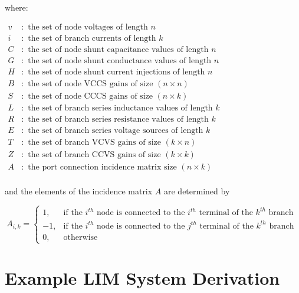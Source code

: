 where: 
\smallskip

$\begin{aligned}
    v & : \text{ the set of node voltages of length } n \\
    i & : \text{ the set of branch currents of length } k \\
    C & : \text{ the set of node shunt capacitance values of length } n \\
    G & : \text{ the set of node shunt conductance values of length } n \\
    H & : \text{ the set of node shunt current injections of length } n \\
    B & : \text{ the set of node VCCS gains of size } (n \times n) \\
    S & : \text{ the set of node CCCS gains of size } (n \times k) \\
    L & : \text{ the set of branch series inductance values of length } k \\
    R & : \text{ the set of branch series resistance values of length } k \\
    E & : \text{ the set of branch series voltage sources of length } k \\
    T & : \text{ the set of branch VCVS gains of size } (k \times n) \\
    Z & : \text{ the set of branch CCVS gains of size } (k \times k) \\
    A & : \text{ the port connection incidence matrix size } (n \times k) \\
\end{aligned}$

\bigskip
and the elements of the incidence matrix $A$ are determined by
\smallskip

\begin{equation} \label{eq:a_matrix}
    A_{i, k} = 
    \begin{cases}
        1,  & \text{if the } i^{th} \text{ node is connected to the } i^{th} \text{ terminal of the } k^{th} \text{ branch }\\ 
        -1, & \text{if the } i^{th} \text{ node is connected to the } j^{th} \text{ terminal of the } k^{th} \text{ branch }\\ 
        0,  & \text{otherwise}
    \end{cases}
\end{equation}

\bigskip

\section{Example LIM System Derivation} 

